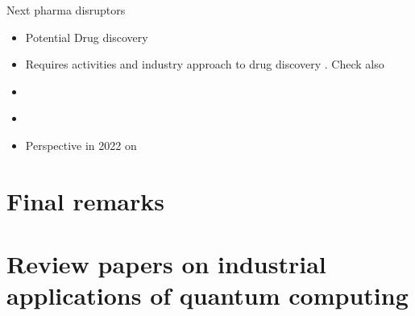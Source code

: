 \documentclass[a4paper,11pt]{article}
\begin{document}
Next pharma disruptors \cite{cova2021artificial}

\begin{itemize}
\item Potential Drug discovery \cite{cao2018potential}
\item Requires activities and industry approach to drug discovery \cite{zinner2022institutionalization}. Check also \cite{zinner2021quantum}
\item  \cite{floether2023state}
%
\item \cite{cordier2022biology}

\item Perspective in 2022 on \cite{blunt2022perspective}
\end{itemize}
\newpage 
\section{Final remarks}


\appendix

\section{Review papers on industrial applications of quantum computing}
\end{document}
